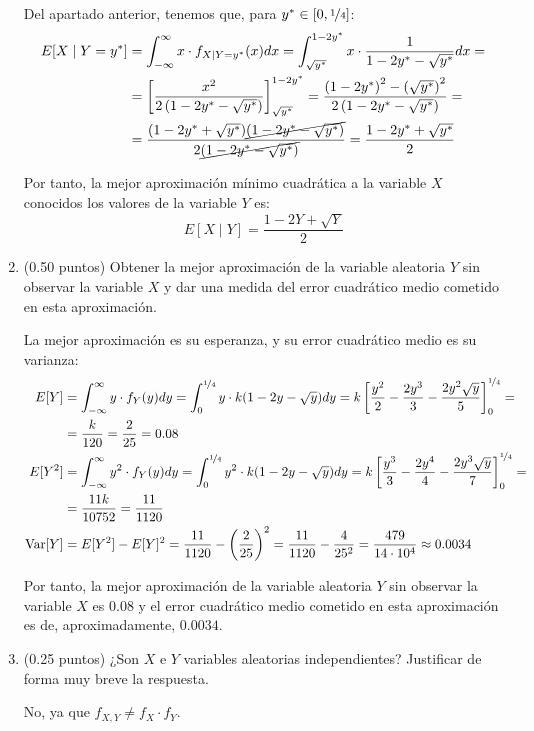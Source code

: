 \documentclass[12pt]{article}
\DeclareMathOperator{\Var}{Var}
\begin{document}
\begin{ejercicio}[5 puntos]
\begin{enumerate}
            Del apartado anterior, tenemos que, para $y^*\in \left[0,\nicefrac{1}{4}\right]$:
            \begin{align*}
                E[X\mid Y=y^*] &= \int_{-\infty}^{\infty} x\cdot f_{X\mid Y=y^*}(x)dx
                = \int_{\sqrt{y^*}}^{1-2y^*} x\cdot \dfrac{1}{1-2y^*-\sqrt{y^*}}dx
                =\\&= \left[\dfrac{x^2}{2\left(1-2y^*-\sqrt{y^*}\right)}\right]_{\sqrt{y^*}}^{1-2y^*}
                = \dfrac{\left(1-2y^*\right)^2-\left(\sqrt{y^*}\right)^2}{2\left(1-2y^*-\sqrt{y^*}\right)}
                =\\&= \dfrac{(1-2y^*+\sqrt{y^*})\cancel{(1-2y^*-\sqrt{y^*})}}{2\cancel{(1-2y^*-\sqrt{y^*})}}
                = \dfrac{1-2y^*+\sqrt{y^*}}{2}
            \end{align*}

            Por tanto, la mejor aproximación mínimo cuadrática a la variable $X$ conocidos los valores de la variable $Y$ es:
            \begin{equation*}
                E[X\mid Y] = \dfrac{1-2Y+\sqrt{Y}}{2}
            \end{equation*}
            \item (0.50 puntos) Obtener la mejor aproximación de la variable aleatoria $Y$ sin observar la variable $X$ y dar una medida del error cuadrático medio cometido en esta aproximación.
            
            La mejor aproximación es su esperanza, y su error cuadrático medio es su varianza:
            \begin{align*}
                E[Y] &= \int_{-\infty}^{\infty} y\cdot f_Y(y)dy = \int_{0}^{\nicefrac{1}{4}} y\cdot k(1-2y-\sqrt{y})dy
                = k\left[\dfrac{y^2}{2}-\dfrac{2y^3}{3}-\dfrac{2y^2\sqrt{y}}{5}\right]_{0}^{\nicefrac{1}{4}} =\\&= \dfrac{k}{120} = \dfrac{2}{25} = 0.08\\
                E[Y^2] &= \int_{-\infty}^{\infty} y^2\cdot f_Y(y)dy = \int_{0}^{\nicefrac{1}{4}} y^2\cdot k(1-2y-\sqrt{y})dy
                = k\left[\dfrac{y^3}{3}-\dfrac{2y^4}{4}-\dfrac{2y^3\sqrt{y}}{7}\right]_{0}^{\nicefrac{1}{4}} =\\&= \dfrac{11k}{10752} = \dfrac{11}{1120}\\
                \Var[Y] &= E[Y^2] - E[Y]^2 = \dfrac{11}{1120} - \left(\dfrac{2}{25}\right)^2 = \dfrac{11}{1120} - \dfrac{4}{25^2} = \dfrac{479}{14\cdot 10^4} \approx 0.0034
            \end{align*}

            Por tanto, la mejor aproximación de la variable aleatoria $Y$ sin observar la variable $X$ es $0.08$ y el error cuadrático medio cometido en esta aproximación es de, aproximadamente, $0.0034$.
            \item (0.25 puntos) ¿Son $X$ e $Y$ variables aleatorias independientes? Justificar de forma muy breve la respuesta.
            
            No, ya que $f_{X,Y}\neq f_X\cdot f_Y$.
        \end{enumerate}
    \end{ejercicio}
\end{document}
